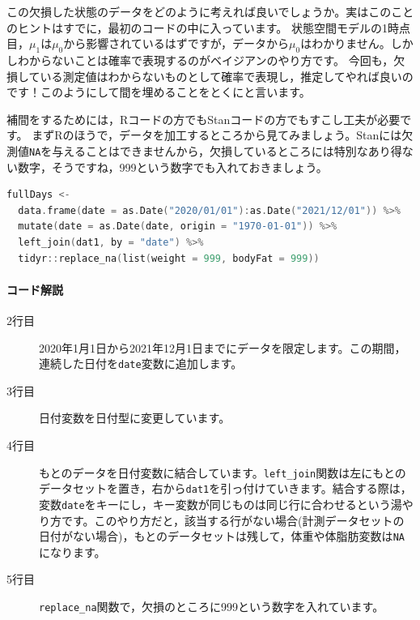 \documentclass{ltjsbook}
\begin{document}
この欠損した状態のデータをどのように考えれば良いでしょうか。実はこのことのヒントはすでに，最初のコードの中に入っています。
状態空間モデルの1時点目，$\mu_1$は$\mu_0$から影響されているはずですが，データから$\mu_0$はわかりません。しかしわからないことは確率で表現するのがベイジアンのやり方です。
今回も，欠損している測定値はわからないものとして確率で表現し，推定してやれば良いのです！このようにして間を埋めることをとくにと言います。

補間をするためには，Rコードの方でもStanコードの方でもすこし工夫が必要です。
まずRのほうで，データを加工するところから見てみましょう。Stanには欠測値\verb|NA|を与えることはできませんから，欠損しているところには特別なあり得ない数字，そうですね，999という数字でも入れておきましょう。

\begin{lstlisting}[language=c++,label={code:29_03},caption={連続したデータを作り欠測値に借りの値を代入する}]
fullDays <- 
  data.frame(date = as.Date("2020/01/01"):as.Date("2021/12/01")) %>%
  mutate(date = as.Date(date, origin = "1970-01-01")) %>%
  left_join(dat1, by = "date") %>%
  tidyr::replace_na(list(weight = 999, bodyFat = 999))
\end{lstlisting}
\paragraph{コード解説}
\begin{description}
	\item[2行目] 2020年1月1日から2021年12月1日までにデータを限定します。この期間，連続した日付を\verb|date|変数に追加します。
	\item[3行目] 日付変数を日付型に変更しています。
	\item[4行目] もとのデータを日付変数に結合しています。\verb|left_join|関数は左にもとのデータセットを置き，右から\verb|dat1|を引っ付けていきます。結合する際は，変数\verb|date|をキーにし，キー変数が同じものは同じ行に合わせるという湯やり方です。このやり方だと，該当する行がない場合(計測データセットの日付がない場合)，もとのデータセットは残して，体重や体脂肪変数は\verb|NA|になります。
	\item[5行目] \verb|replace_na|関数で，欠損のところに999という数字を入れています。
\end{description}
\end{document}
